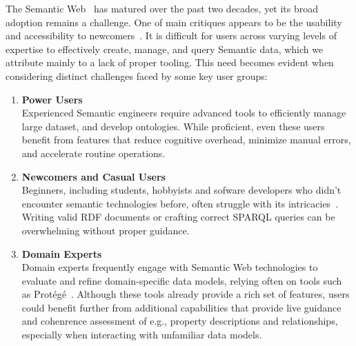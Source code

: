 The Semantic Web~\cite{Berners-Lee_SA_2001} has matured over the past two decades, yet its broad adoption remains a challenge.
One of main critiques appears to be the usability and accessibility to newcomers~\cite{10.3233/SW-190387}.
It is difficult for users across varying levels of expertise to effectively create, manage, and query Semantic data, which we attribute mainly to a lack of proper tooling.
This need becomes evident when considering distinct challenges faced by some key user groups:

\begin{enumerate}
  \item \textbf{Power Users}\\
    Experienced Semantic engineers require advanced tools to efficiently manage large dataset, and develop ontologies.
    While proficient, even these users benefit from features that reduce cognitive overhead, minimize manual errors, and accelerate routine operations.

  \item \textbf{Newcomers and Casual Users}\\
    Beginners, including students, hobbyists and sofware developers who didn't encounter semantic technologies before, often struggle with its intricacies~\cite{EvensteinSigalov2023,Turki2021RepresentingCI}. 
    Writing valid RDF documents or crafting correct SPARQL queries can be overwhelming without proper guidance. 

\item \textbf{Domain Experts}\\
   Domain experts frequently engage with Semantic Web technologies to evaluate and refine domain-specific data models, relying often on tools such as Protégé~\cite{protege2015}.
   Although these tools already provide a rich set of features, users could benefit further from additional capabilities that provide live guidance and cohenrence assessment of e.g., property descriptions and relationships, especially when interacting with unfamiliar data models.


\end{enumerate}
